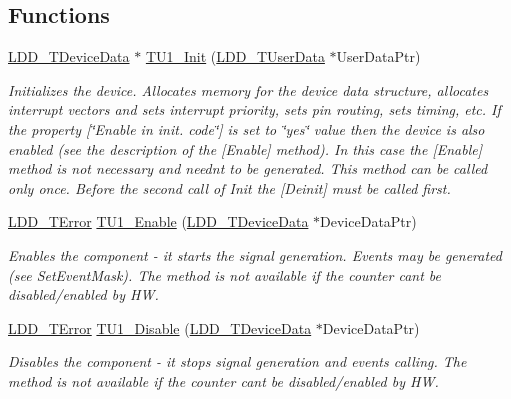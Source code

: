 \subsection*{Functions}
\begin{DoxyCompactItemize}
\item 
\hyperlink{group___p_e___types__module_gac5cf1362f1f0e3a2ce71b1bf2276d091}{L\+D\+D\+\_\+\+T\+Device\+Data} $\ast$ \hyperlink{group___t_u1__module_ga9bfbdf45fe9128c8d9e4245e3480d6da}{T\+U1\+\_\+\+Init} (\hyperlink{group___p_e___types__module_ga0b66a73f87238a782318aa0be7578e35}{L\+D\+D\+\_\+\+T\+User\+Data} $\ast$User\+Data\+Ptr)
\begin{DoxyCompactList}\small\item\em Initializes the device. Allocates memory for the device data structure, allocates interrupt vectors and sets interrupt priority, sets pin routing, sets timing, etc. If the property \mbox{[}\char`\"{}\+Enable in init. code\char`\"{}\mbox{]} is set to \char`\"{}yes\char`\"{} value then the device is also enabled (see the description of the \mbox{[}Enable\mbox{]} method). In this case the \mbox{[}Enable\mbox{]} method is not necessary and needn\textquotesingle{}t to be generated. This method can be called only once. Before the second call of Init the \mbox{[}Deinit\mbox{]} must be called first. \end{DoxyCompactList}\item 
\hyperlink{group___p_e___types__module_ga24c2b045fd04e79e85f261ce4df35588}{L\+D\+D\+\_\+\+T\+Error} \hyperlink{group___t_u1__module_ga8afe0865e773903efe7de4629c06eaa1}{T\+U1\+\_\+\+Enable} (\hyperlink{group___p_e___types__module_gac5cf1362f1f0e3a2ce71b1bf2276d091}{L\+D\+D\+\_\+\+T\+Device\+Data} $\ast$Device\+Data\+Ptr)
\begin{DoxyCompactList}\small\item\em Enables the component -\/ it starts the signal generation. Events may be generated (see Set\+Event\+Mask). The method is not available if the counter can\textquotesingle{}t be disabled/enabled by HW. \end{DoxyCompactList}\item 
\hyperlink{group___p_e___types__module_ga24c2b045fd04e79e85f261ce4df35588}{L\+D\+D\+\_\+\+T\+Error} \hyperlink{group___t_u1__module_ga9b93f60b75b41cf6a57cf827467c0690}{T\+U1\+\_\+\+Disable} (\hyperlink{group___p_e___types__module_gac5cf1362f1f0e3a2ce71b1bf2276d091}{L\+D\+D\+\_\+\+T\+Device\+Data} $\ast$Device\+Data\+Ptr)
\begin{DoxyCompactList}\small\item\em Disables the component -\/ it stops signal generation and events calling. The method is not available if the counter can\textquotesingle{}t be disabled/enabled by HW. \end{DoxyCompactList}\item 

\end{DoxyCompactItemize}
